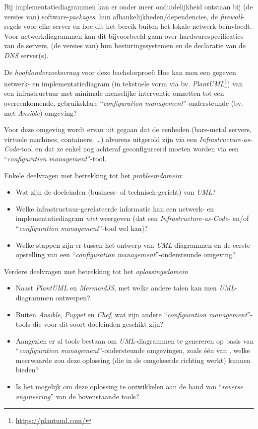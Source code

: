Bij implementatiediagrammen kan er onder meer onduidelijkheid ontstaan bij (de versies van) software-\emph{packages}, hun afhankelijkheden/dependencies, de \emph{firewall}-regels voor elke server en hoe dit het bereik buiten het lokale netwerk beïnvloedt.
Voor netwerkdiagrammen kan dit bijvoorbeeld gaan over hardwarespecificaties van de servers, (de versies van) hun besturingssystemen en de declaratie van de \emph{DNS} server(s).

De \emph{hoofdonderzoeksvraag} voor deze bachelorproef:
Hoe kan men een gegeven netwerk- en implementatiediagram (in tekstuele vorm via bv. \emph{PlantUML}\footnote{\url{https://plantuml.com/}}) van een infrastructuur met minimale menselijke interventie omzetten tot een overeenkomende, gebruiksklare ``\emph{configuration management}''-ondersteunde (bv. met \emph{Ansible}) omgeving?

Voor deze omgeving wordt ervan uit gegaan dat de eenheden (bare-metal servers, virtuele machines, containers, \ldots) alvorens uitgerold zijn via een \emph{Infrastructure-as-Code}-tool en dat ze enkel nog achteraf geconfigureerd moeten worden via een ``\emph{configuration management}''-tool.

Enkele deelvragen met betrekking tot het \emph{probleemdomein}:

\begin{itemize}
  \item Wat zijn de doeleinden (business- of technisch-gericht) van \emph{UML}?
  \item Welke infrastructuur-gerelateerde informatie kan een netwerk- en implementatiediagram \emph{niet} weergeven (dat een \emph{Infrastructure-as-Code}- en/of ``\emph{configuration management}''-tool wel kan)?
  \item Welke stappen zijn er tussen het ontwerp van \emph{UML}-diagrammen en de eerste opstelling van een ``\emph{configuration management}''-ondersteunde omgeving?
\end{itemize}

Verdere deelvragen met betrekking tot het \emph{oplossingsdomein}

\begin{itemize}
  \item Naast \emph{PlantUML} en \emph{MermaidJS}, met welke andere talen kan men \emph{UML}-diagrammen ontwerpen?
  \item Buiten \emph{Ansible}, \emph{Puppet} en \emph{Chef}, wat zijn andere ``\emph{configuration management}''-tools die voor dit soort doeleinden geschikt zijn?
  \item Aangezien er al tools bestaan om \emph{UML}-diagrammen te genereren op basis van ``\emph{configuration management}''-ondersteunde omgevingen, zoals één van \textcite{teramako2023}, welke meerwaarde zou deze oplossing (die in de omgekeerde richting werkt) kunnen bieden?
  \item Is het mogelijk om deze oplossing te ontwikkelen aan de hand van ``\emph{reverse engineering}'' van de bovenstaande tools?
\end{itemize}

